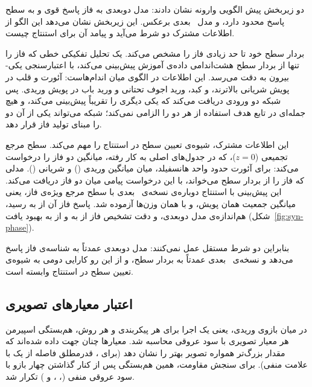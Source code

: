 دو زیربخش پیش الگویی وارونه نشان دادند: مدل دوبعدی به فاز پاسخ قوی و به سطح پاسخ محدود دارد، و مدل ~بعدی برعکس. این زیربخش نشان می‌دهد این الگو از اطلاعات مشترک دو شرط می‌آید و پیامد آن برای استنتاج چیست.

بردار سطح خود تا حد زیادی فاز را مشخص می‌کند. یک تحلیل تفکیکی خطی که فاز را تنها از بردار سطح هشت‌اندامی داده‌ی آموزش پیش‌بینی می‌کند، با اعتبارسنجی یکی-بیرون به دقت  می‌رسد. این اطلاعات در الگوی میان اندام‌هاست: آئورت و قلب در پویش شریانی بالاترند، و کبد، ورید اجوف تحتانی و ورید باب در پویش وریدی. پس شبکه دو ورودی دریافت می‌کند که یکی دیگری را تقریباً پیش‌بینی می‌کند، و هیچ جمله‌ای در تابع هدف استفاده از هر دو را الزامی نمی‌کند؛ شبکه می‌تواند یکی از آن دو را مبنای تولید فاز قرار دهد.

این اطلاعات مشترک، شیوه‌ی تعیین سطح در استنتاج را مهم می‌کند. سطح مرجع تجمیعی ($z = 0$)، که در جدول‌های اصلی به کار رفته، میانگین دو فاز را درخواست می‌کند: برای آئورت حدود  واحد هانسفیلد، میان میانگین وریدی () و شریانی (). مدلی که فاز را از بردار سطح می‌خواند، با این درخواست پیامی میان دو فاز دریافت می‌کند. این پیش‌بینی با استنتاج دوباره‌ی نسخه‌ی ~بعدی با سطح مرجع ویژه‌ی فاز، یعنی میانگین جمعیت همان پویش، و با همان وزن‌ها آزموده شد. پاسخ فاز آن از  به  رسید، هم‌اندازه‌ی مدل دوبعدی، و دقت تشخیص فاز از  به  و  از  به  بهبود یافت (شکل~\ref{fig:syn-phase}).

بنابراین دو شرط  مستقل عمل نمی‌کنند: مدل دوبعدی عمدتاً به شناسه‌ی فاز پاسخ می‌دهد و نسخه‌ی ~بعدی عمدتاً به بردار سطح، و از این رو کارایی دومی به شیوه‌ی تعیین سطح در استنتاج وابسته است. 

\subsection{اعتبار معیارهای تصویری}

در میان  بازوی وریدی، یعنی یک اجرا برای هر پیکربندی و هر روش، هم‌بستگی اسپیرمن هر معیار تصویری با سود عروقی محاسبه شد. معیارها چنان جهت داده شده‌اند که مقدار بزرگ‌تر همواره تصویر بهتر را نشان دهد (برای ، قدرمطلق فاصله از یک با علامت منفی). برای سنجش مقاومت، همین هم‌بستگی پس از کنار گذاشتن چهار بازو با سود عروقی منفی (، ،  و ) تکرار شد.

